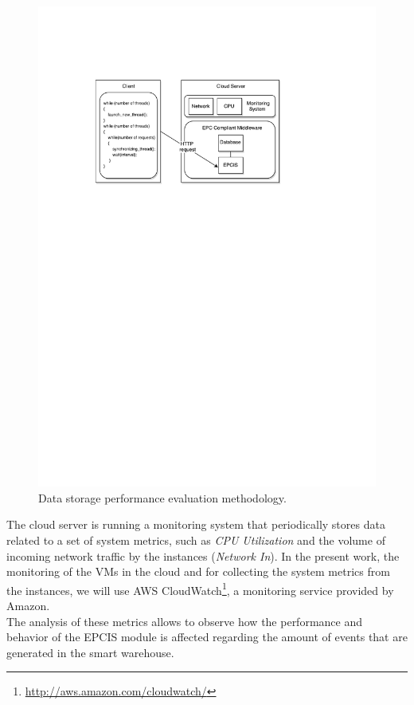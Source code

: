 \begin{figure}[ht!]
  \centering
  \includegraphics[width=.9\textwidth]{./images/eval_data_methodology}
  \caption[Data storage evaluation methodology.]{Data storage performance evaluation methodology.}
  \label{fig:eval_data_methodology}
\end{figure}

The cloud server is running a monitoring system that periodically stores data related to a set of
system metrics, such as \textit{CPU Utilization} and the volume of incoming network traffic
by the instances (\textit{Network In}). In the present work, the monitoring of the \glspl{VM} in the
cloud and for collecting the system metrics from the instances, we will use \gls{AWS}
CloudWatch\footnote{\url{http://aws.amazon.com/cloudwatch/}}, a monitoring service provided by Amazon.\\

The analysis of these metrics allows to observe how the performance and behavior of the \gls{EPCIS}
module is affected regarding the amount of events that are generated in the smart warehouse.

